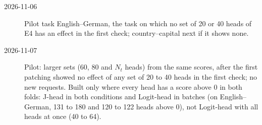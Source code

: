 \documentclass[11pt,a4paper]{article}
\begin{document}
\begin{description}
  \item[2026-11-06] Pilot task English--German, the task on which no set of 20 or 40 heads of E4 has an effect in the first check; country--capital next if it shows none.
  \item[2026-11-07] Pilot: larger sets (60, 80 and $N_t$ heads) from the same scores, after the first patching showed no effect of any set of 20 to 40 heads in the first check; no new requests. Built only where every head has a score above 0 in both folds: J-head in both conditions and Logit-head in batches (on English--German, 131 to 180 and 120 to 122 heads above 0), not Logit-head with all heads at once (40 to 64).
\end{description}



\end{document}
